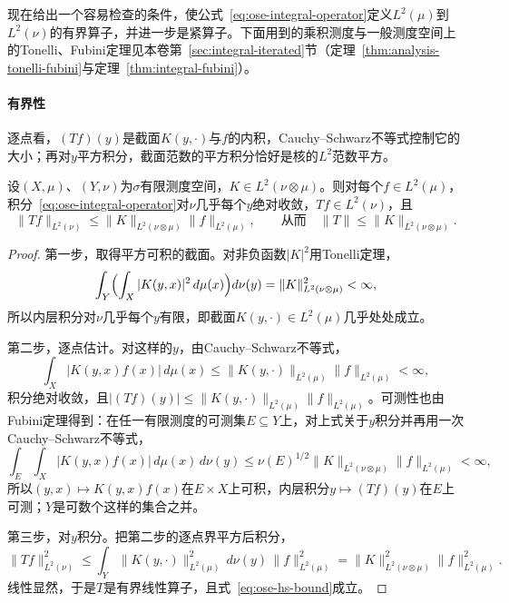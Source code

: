 现在给出一个容易检查的条件，使公式~\eqref{eq:ose-integral-operator}定义$L^2(\mu)$到$L^2(\nu)$的有界算子，并进一步是紧算子。下面用到的乘积测度与一般测度空间上的Tonelli、Fubini定理见本卷第~\ref{sec:integral-iterated}节（定理~\ref{thm:analysis-tonelli-fubini}与定理~\ref{thm:integral-fubini}）。

\paragraph{有界性}
逐点看，$(Tf)(y)$是截面$K(y,\cdot)$与$f$的内积，Cauchy–Schwarz不等式控制它的大小；再对$y$平方积分，截面范数的平方积分恰好是核的$L^2$范数平方。

\begin{theorem}[平方可积核的有界性]
\label{thm:ose-hs-bounded}
设$(X,\mu)$、$(Y,\nu)$为$\sigma$有限测度空间，$K\in L^2(\nu\otimes\mu)$。则对每个$f\in L^2(\mu)$，积分~\eqref{eq:ose-integral-operator}对$\nu$几乎每个$y$绝对收敛，$Tf\in L^2(\nu)$，且
\begin{equation}
  \|Tf\|_{L^2(\nu)}\leq\|K\|_{L^2(\nu\otimes\mu)}\|f\|_{L^2(\mu)},\qquad\text{从而}\quad\|T\|\leq\|K\|_{L^2(\nu\otimes\mu)} .
  \label{eq:ose-hs-bound}
\end{equation}
\end{theorem}

\begin{proof}
第一步，取得平方可积的截面。对非负函数$|K|^2$用Tonelli定理，
\[
  \int_Y\Bigl(\int_X|K(y,x)|^2\,d\mu(x)\Bigr)d\nu(y)=\|K\|_{L^2(\nu\otimes\mu)}^2<\infty ,
\]
所以内层积分对$\nu$几乎每个$y$有限，即截面$K(y,\cdot)\in L^2(\mu)$几乎处处成立。

第二步，逐点估计。对这样的$y$，由Cauchy–Schwarz不等式，
\[
  \int_X|K(y,x)f(x)|\,d\mu(x)\leq\|K(y,\cdot)\|_{L^2(\mu)}\|f\|_{L^2(\mu)}<\infty ,
\]
积分绝对收敛，且$|(Tf)(y)|\leq\|K(y,\cdot)\|_{L^2(\mu)}\|f\|_{L^2(\mu)}$。可测性也由Fubini定理得到：在任一有限测度的可测集$E\subseteq Y$上，对上式关于$y$积分并再用一次Cauchy–Schwarz不等式，
\[
  \int_E\int_X|K(y,x)f(x)|\,d\mu(x)\,d\nu(y)\leq\nu(E)^{1/2}\|K\|_{L^2(\nu\otimes\mu)}\|f\|_{L^2(\mu)}<\infty ,
\]
所以$(y,x)\mapsto K(y,x)f(x)$在$E\times X$上可积，内层积分$y\mapsto(Tf)(y)$在$E$上可测；$Y$是可数个这样的集合之并。

第三步，对$y$积分。把第二步的逐点界平方后积分，
\[
  \|Tf\|_{L^2(\nu)}^2\leq\int_Y\|K(y,\cdot)\|_{L^2(\mu)}^2\,d\nu(y)\,\|f\|_{L^2(\mu)}^2=\|K\|_{L^2(\nu\otimes\mu)}^2\|f\|_{L^2(\mu)}^2 .
\]
线性显然，于是$T$是有界线性算子，且式~\eqref{eq:ose-hs-bound}成立。
\end{proof}

